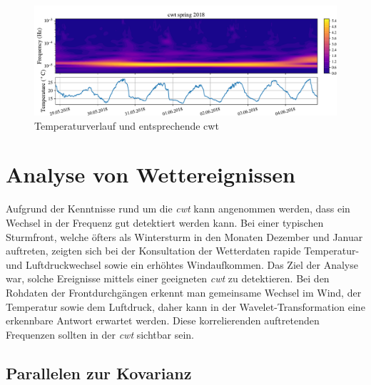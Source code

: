\begin{refsection}
\begin{figure}[h]
	\centering
	\includegraphics[width=1\textwidth]{papers/wwt/images/data_spring.pdf}
	\caption{Temperaturverlauf und entsprechende cwt}
	\label{fig:cwt_zoom}
\end{figure}



\section{Analyse von Wettereignissen}
Aufgrund der Kenntnisse rund um die \textit{cwt} kann angenommen werden, dass ein Wechsel in der Frequenz gut detektiert werden kann.
Bei einer typischen Sturmfront, welche öfters als Wintersturm in den Monaten Dezember und Januar auftreten, zeigten sich bei der Konsultation der Wetterdaten rapide Temperatur- und Luftdruckwechsel sowie ein erhöhtes Windaufkommen.
Das Ziel der Analyse war, solche Ereignisse mittels einer geeigneten \textit{cwt} zu detektieren.
Bei den Rohdaten der Frontdurchgängen erkennt man gemeinsame Wechsel im Wind, der Temperatur sowie dem Luftdruck, daher kann in der Wavelet-Transformation eine erkennbare Antwort erwartet werden. 
Diese korrelierenden auftretenden Frequenzen sollten in der \textit{cwt} sichtbar sein.

\subsection{Parallelen zur Kovarianz}


\end{refsection}
